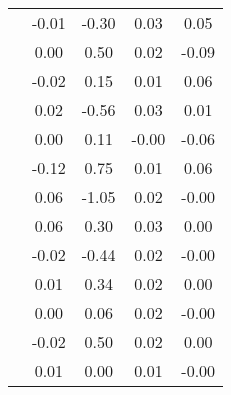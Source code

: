 \begin{table}
\begin{tabular}{c|cc|cc|}
\multicolumn{1}{|c|}{} & \multicolumn{1}{|c|}{     -0.01} & \multicolumn{1}{|c|}{     -0.30} & \multicolumn{1}{|c|}{      0.03} & \multicolumn{1}{|c|}{      0.05} \\ 
\multicolumn{1}{|c|}{} & \multicolumn{1}{|c|}{      0.00} & \multicolumn{1}{|c|}{      0.50} & \multicolumn{1}{|c|}{      0.02} & \multicolumn{1}{|c|}{     -0.09} \\ 
\multicolumn{1}{|c|}{} & \multicolumn{1}{|c|}{     -0.02} & \multicolumn{1}{|c|}{      0.15} & \multicolumn{1}{|c|}{      0.01} & \multicolumn{1}{|c|}{      0.06} \\ 
\multicolumn{1}{|c|}{} & \multicolumn{1}{|c|}{      0.02} & \multicolumn{1}{|c|}{     -0.56} & \multicolumn{1}{|c|}{      0.03} & \multicolumn{1}{|c|}{      0.01} \\ 
\multicolumn{1}{|c|}{} & \multicolumn{1}{|c|}{      0.00} & \multicolumn{1}{|c|}{      0.11} & \multicolumn{1}{|c|}{     -0.00} & \multicolumn{1}{|c|}{     -0.06} \\ 
\multicolumn{1}{|c|}{} & \multicolumn{1}{|c|}{     -0.12} & \multicolumn{1}{|c|}{      0.75} & \multicolumn{1}{|c|}{      0.01} & \multicolumn{1}{|c|}{      0.06} \\ 
\multicolumn{1}{|c|}{} & \multicolumn{1}{|c|}{      0.06} & \multicolumn{1}{|c|}{     -1.05} & \multicolumn{1}{|c|}{      0.02} & \multicolumn{1}{|c|}{     -0.00} \\ 
\multicolumn{1}{|c|}{} & \multicolumn{1}{|c|}{      0.06} & \multicolumn{1}{|c|}{      0.30} & \multicolumn{1}{|c|}{      0.03} & \multicolumn{1}{|c|}{      0.00} \\ 
\multicolumn{1}{|c|}{} & \multicolumn{1}{|c|}{     -0.02} & \multicolumn{1}{|c|}{     -0.44} & \multicolumn{1}{|c|}{      0.02} & \multicolumn{1}{|c|}{     -0.00} \\ 
\multicolumn{1}{|c|}{} & \multicolumn{1}{|c|}{      0.01} & \multicolumn{1}{|c|}{      0.34} & \multicolumn{1}{|c|}{      0.02} & \multicolumn{1}{|c|}{      0.00} \\ 
\multicolumn{1}{|c|}{} & \multicolumn{1}{|c|}{      0.00} & \multicolumn{1}{|c|}{      0.06} & \multicolumn{1}{|c|}{      0.02} & \multicolumn{1}{|c|}{     -0.00} \\ 
\multicolumn{1}{|c|}{} & \multicolumn{1}{|c|}{     -0.02} & \multicolumn{1}{|c|}{      0.50} & \multicolumn{1}{|c|}{      0.02} & \multicolumn{1}{|c|}{      0.00} \\ 
\multicolumn{1}{|c|}{} & \multicolumn{1}{|c|}{      0.01} & \multicolumn{1}{|c|}{      0.00} & \multicolumn{1}{|c|}{      0.01} & \multicolumn{1}{|c|}{     -0.00} \\ 

\end{tabular}
\end{table}

